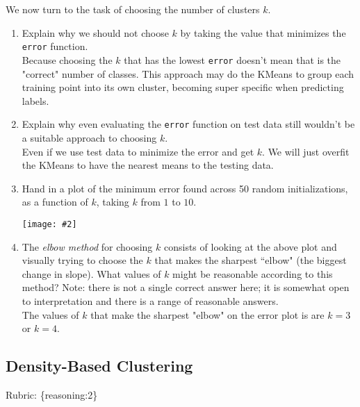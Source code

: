 \documentclass{article}
\def\rubric#1{\gre{Rubric: \{#1\}}}{}
\def\blu#1{{\color{blu}#1}}
\def\gre#1{{\color{gre}#1}}
\def\ans#1{{\color{ans}#1}}
\newcommand{\centerfig}[2]{\begin{center}\texttt{[image: \#2]}\end{center}}
\def\enum#1{\begin{enumerate}#1\end{enumerate}}
\begin{document}
 We now turn to the task of choosing the number of clusters $k$.

 \blu{\enum{
 \item Explain why we should not choose $k$ by taking the value that minimizes the \texttt{error} function. \\
    \ans{
      Because choosing the $k$ that has the lowest \texttt{error} doesn't mean that is the "correct" number of classes. 
      This approach may do the KMeans to group each training point into its own cluster, becoming super 
      specific when predicting labels.
    }
 \item Explain why even evaluating the \texttt{error} function on test data still wouldn't be a suitable approach to choosing $k$. \\
    \ans{
      Even if we use test data to minimize the error and get $k$. We will just overfit the KMeans to have 
      the nearest means to the testing data.
    }
 \item Hand in a plot of the minimum error found across 50 random initializations, as a function of $k$, taking $k$ from $1$ to $10$. \\
    \ans{
      \centerfig{1}{../figs/q5_2_Kmeans_errors.pdf}
    }
 \item The \emph{elbow method} for choosing $k$ consists of looking at the above plot and visually trying to choose the $k$ that makes the sharpest ``elbow" (the biggest change in slope). What values of $k$ might be reasonable according to this method? Note: there is not a single correct answer here; it is somewhat open to interpretation and there is a range of reasonable answers. \\
    \ans{
      The values of $k$ that make the sharpest "elbow" on the error plot is are $k=3$ or $k=4$.
    }
 }}

\subsection{Density-Based Clustering}
\rubric{reasoning:2}
\end{document}
